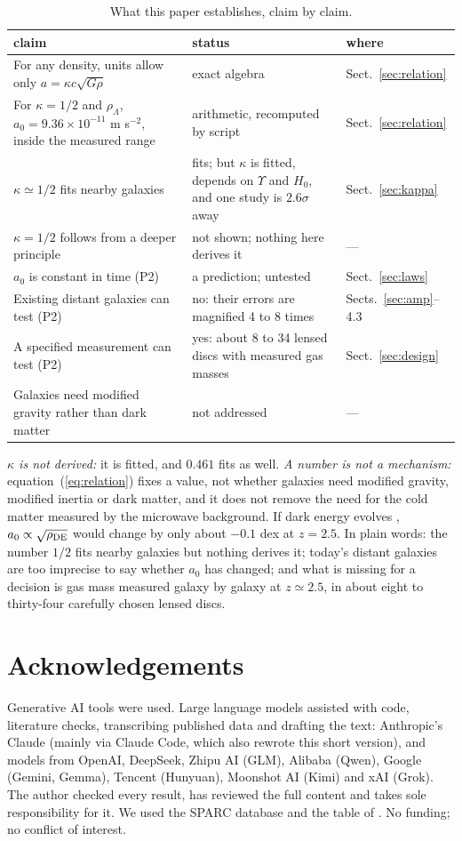 \documentclass[fleqn,usenatbib]{mnras}
\begin{document}
\begin{table}
\caption{What this paper establishes, claim by claim.}
\label{tab:ledger}
\begin{tabular}{p{}p{}l}
\toprule
claim & status & where\\
\midrule
For any density, units allow only $a=\kappa c\sqrt{G\rho}$ & exact algebra & Sect.~\ref{sec:relation}\\
For $\kappa=1/2$ and $\rho_\Lambda$, $a_0=9.36\times10^{-11}$ m s$^{-2}$, inside the measured range & arithmetic, recomputed by script & Sect.~\ref{sec:relation}\\
$\kappa\simeq1/2$ fits nearby galaxies & fits; but $\kappa$ is fitted, depends on $\Upsilon$ and $H_0$, and one study is $2.6\sigma$ away & Sect.~\ref{sec:kappa}\\
$\kappa=1/2$ follows from a deeper principle & not shown; nothing here derives it & ---\\
$a_0$ is constant in time (P2) & a prediction; untested & Sect.~\ref{sec:laws}\\
Existing distant galaxies can test (P2) & no: their errors are magnified 4 to 8 times & Sects.~\ref{sec:amp}--4.3\\
A specified measurement can test (P2) & yes: about 8 to 34 lensed discs with measured gas masses & Sect.~\ref{sec:design}\\
Galaxies need modified gravity rather than dark matter & not addressed & ---\\
\bottomrule
\end{tabular}
\end{table}

\emph{$\kappa$ is not derived:} it is fitted, and $0.461$ fits as well. \emph{A number is not a mechanism:} equation~(\ref{eq:relation}) fixes a value, not whether galaxies need modified gravity, modified inertia or dark matter, and it does not remove the need for the cold matter measured by the microwave background. If dark energy evolves \citep{DESI2025}, $a_0\propto\sqrt{\rho_{\rm DE}}$ would change by only about $-0.1$ dex at $z=2.5$. In plain words: the number $1/2$ fits nearby galaxies but nothing derives it; today's distant galaxies are too imprecise to say whether $a_0$ has changed; and what is missing for a decision is gas mass measured galaxy by galaxy at $z\simeq2.5$, in about eight to thirty-four carefully chosen lensed discs.

\section*{Acknowledgements}
Generative AI tools were used. Large language models assisted with code, literature checks, transcribing published data and drafting the text: Anthropic's Claude (mainly via Claude Code, which also rewrote this short version), and models from OpenAI, DeepSeek, Zhipu AI (GLM), Alibaba (Qwen), Google (Gemini, Gemma), Tencent (Hunyuan), Moonshot AI (Kimi) and xAI (Grok). The author checked every result, has reviewed the full content and takes sole responsibility for it. We used the SPARC database \citep{Lelli2016} and the table of \citet{NestorShachar2023}. No funding; no conflict of interest.
\end{document}
